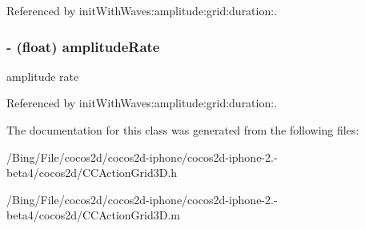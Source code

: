 Referenced by init\-With\-Waves\-:amplitude\-:grid\-:duration\-:.

\hypertarget{interface_c_c_liquid_a14994638d5ea77d6295f0fee55d320f3}{
\subsubsection[{amplitude\-Rate}]{\setlength{\rightskip}{0pt plus 5cm}-\/ (float) {\bf amplitude\-Rate}}}\label{interface_c_c_liquid_a14994638d5ea77d6295f0fee55d320f3}
amplitude rate 

Referenced by init\-With\-Waves\-:amplitude\-:grid\-:duration\-:.



The documentation for this class was generated from the following files\-:\begin{DoxyCompactItemize}
\item 
/\-Bing/\-File/cocos2d/cocos2d-\/iphone/cocos2d-\/iphone-\/2.-\/beta4/cocos2d/C\-C\-Action\-Grid3\-D.\-h\item 
/\-Bing/\-File/cocos2d/cocos2d-\/iphone/cocos2d-\/iphone-\/2.-\/beta4/cocos2d/C\-C\-Action\-Grid3\-D.\-m\end{DoxyCompactItemize}
